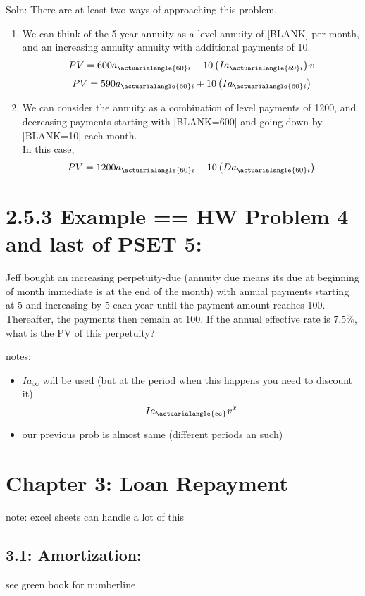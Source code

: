 \documentclass[12pt]{article}
\begin{document}
Soln: There are at least two ways of approaching this problem. \\

\begin{enumerate}
	\item We can think of the 5 year annuity as a level annuity of [BLANK] per month,
		and an increasing annuity annuity with additional payments of 10.
		$$
		PV = 600a_{\actuarialangle{60}i} + 10 \left(Ia_{\actuarialangle{59}i}\right)v
		$$
		$$
		PV = 590a_{\actuarialangle{60}i} + 10 \left(Ia_{\actuarialangle{60}i}\right)
		$$
	\item We can consider the annuity as a combination of level payments of 1200, and 
		decreasing payments starting with [BLANK=600] and going down by [BLANK=10] each month.\\
		In this case, \\
		$$
		PV = 1200a_{\actuarialangle{60}i} - 10 \left(Da_{\actuarialangle{60}i}\right)
		$$


\end{enumerate}

\section{2.5.3 Example == HW Problem 4 and last of PSET 5:}
Jeff bought an increasing perpetuity-due (annuity due means its due at beginning of month
immediate is at the end of the month) with annual payments starting at 5 and increasing by 5 
each year until the payment amount reaches 100. Thereafter, the payments then remain
at 100. If the annual effective rate is $7.5\%$, what is the PV of this perpetuity?

notes: 
\begin{itemize}
	\item  $Ia_{\infty}$ will be used (but at the period when this happens you need to discount it)
		$$
		Ia_{\actuarialangle{\infty}}v^{x}
		$$
	\item  our previous prob is almost same (different periods an such)
\end{itemize}

\section{Chapter 3: Loan Repayment}
note: excel sheets can handle a lot of this
\subsection{3.1: Amortization:}
see green book for numberline
\end{document}
